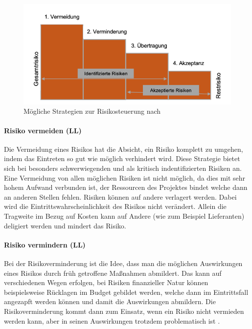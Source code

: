 \documentclass[ThesisDJ.tex]{subfiles}
\begin{document}
\begin{figure}
    \centering
    \includegraphics[width=\linewidth]{risiken.png}
    \caption{Mögliche Strategien zur Risikosteuerung nach \cite{cicek2022risikomanagement}}
    \label{fig:riskstrats}
\end{figure}

\paragraph{Risiko vermeiden (LL)}
Die Vermeidung eines Risikos hat die Absicht, ein Risiko komplett zu umgehen, indem das Eintreten so gut wie möglich verhindert wird. Diese Strategie bietet sich bei besonders schwerwiegenden und als kritisch indentifizierten Risiken an. Eine Vermeidung von allen möglichen Risiken ist nicht möglich, da dies mit sehr hohem Aufwand verbunden ist, der Ressourcen des Projektes bindet welche dann an anderen Stellen fehlen.
Risiken können auf andere verlagert werden. Dabei wird die Eintrittswahrscheinlichkeit des Risikos nicht verändert. Allein die Tragweite im Bezug auf Kosten kann auf Andere (wie zum Beispiel Lieferanten) deligiert werden und mindert das Risiko.


\paragraph{Risiko vermindern (LL)}
Bei der Risikoverminderung ist die Idee, dass man die möglichen Auswirkungen eines Risikos durch früh getroffene Maßnahmen abmildert. Das kann auf verschiedenen Wegen erfolgen, bei Risiken finanzieller Natur können beispielsweise Rücklagen im Budget gebildet werden, welche dann im Eintrittsfall angezapft werden können und damit die Auswirkungen abmildern. Die Risikoverminderung kommt dann zum Einsatz, wenn ein Risiko nicht vermieden werden kann, aber in seinen Auswirkungen trotzdem problematisch ist \cite{dechange_projektmanagement_2024}.
\end{document}
